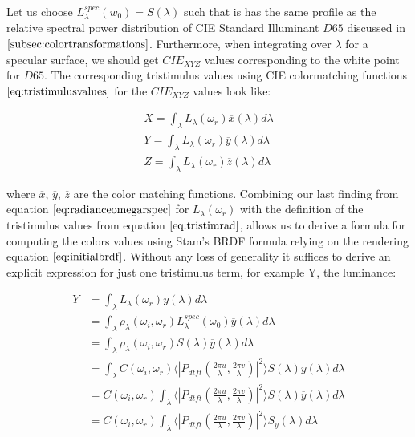 Let us choose $L_\lambda^{spec}(w_0) = S(\lambda)$ such that is has the same profile as the relative spectral power distribution of CIE Standard Illuminant $D65$ discussed in $\ref{subsec:colortransformations}$. Furthermore, when integrating over $\lambda$ for a specular surface, we should get $CIE_{XYZ}$ values corresponding to the white point for $D65$. The corresponding tristimulus values using CIE colormatching functions $\ref{eq:tristimulusvalues}$ for the $CIE_{XYZ}$ values look like:

\begin{align}
X = \int_{\lambda}L_\lambda(\omega_r)\overline{x}(\lambda)d\lambda \nonumber \\
Y = \int_{\lambda}L_\lambda(\omega_r)\overline{y}(\lambda)d\lambda \nonumber \\
Z = \int_{\lambda}L_\lambda(\omega_r)\overline{z}(\lambda)d\lambda
\label{eq:tristimrad}
\end{align}

where $\overline{x}$, $\overline{y}$, $\overline{z}$ are the color matching functions. Combining our last finding from equation $\ref{eq:radianceomegarspec}$ for $L_\lambda(\omega_r)$ with the definition of the tristimulus values from equation $\ref{eq:tristimrad}$, allows us to 
derive a formula for computing the colors values using Stam's BRDF formula relying on the rendering equation $\ref{eq:initialbrdf}$. Without any loss of generality it suffices to derive an explicit expression for just one tristimulus term, for example Y, the luminance:

\begin{align}
Y 
& =\int_{\lambda}L_\lambda(\omega_r)\overline{y}(\lambda)d\lambda \nonumber \\
& =\int_{\lambda}\rho_\lambda(\omega_i,\omega_r)L_\lambda^{spec}(\omega_0) \overline{y}(\lambda)d\lambda \nonumber \\
& =\int_{\lambda}\rho_\lambda(\omega_i,\omega_r) S(\lambda) \overline{y}(\lambda)d\lambda \nonumber \\
& =\int_{\lambda} C(\omega_i,\omega_r) \langle \left|P_{dtft}(\frac{2\pi u}{\lambda}, \frac{2\pi v}{\lambda})\right|^2\rangle S(\lambda) \overline{y}(\lambda)d\lambda \nonumber \\
& = C(\omega_i,\omega_r) \int_{\lambda} \langle \left|P_{dtft}(\frac{2\pi u}{\lambda}, \frac{2\pi v}{\lambda})\right|^2\rangle S(\lambda) \overline{y}(\lambda)d\lambda \nonumber \\
& = C(\omega_i,\omega_r) \int_{\lambda} \langle \left|P_{dtft}(\frac{2\pi u}{\lambda}, \frac{2\pi v}{\lambda})\right|^2\rangle S_y(\lambda)d\lambda
\label{eq:structuralcolorsslow}
\end{align}

